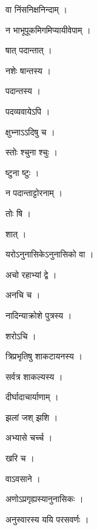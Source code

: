 \documentclass[10pt, openany]{book}
\begin{document}
\noindent वा निंसनिक्षनिन्दाम् ।

\noindent न भाभूपूकमिगमिप्यायीवेपाम् ।

\noindent षात् पदान्तात् ।

\noindent नशेः षान्तस्य ।

\noindent पदान्तस्य ।

\noindent पदव्यवायेऽपि ।

\noindent क्षुभ्नाऽऽदिषु च ।

\noindent स्तोः श्चुना श्चुः ।

\noindent ष्टुना ष्टुः ।

\noindent न पदान्ताट्टोरनाम् ।

\noindent तोः षि ।

\noindent शात् ।

\noindent यरोऽनुनासिकेऽनुनासिको वा ।

\noindent अचो रहाभ्यां द्वे ।

\noindent अनचि च ।

\noindent नादिन्याक्रोशे पुत्रस्य ।

\noindent शरोऽचि ।

\noindent त्रिप्रभृतिषु शाकटायनस्य ।

\noindent सर्वत्र शाकल्यस्य ।

\noindent दीर्घादाचार्याणाम् ।

\noindent झलां जश् झशि ।

\noindent अभ्यासे चर्च्च ।

\noindent खरि च ।

\noindent वाऽवसाने ।

\noindent अणोऽप्रगृह्यस्यानुनासिकः ।

\noindent अनुस्वारस्य ययि परसवर्णः ।
\end{document}
